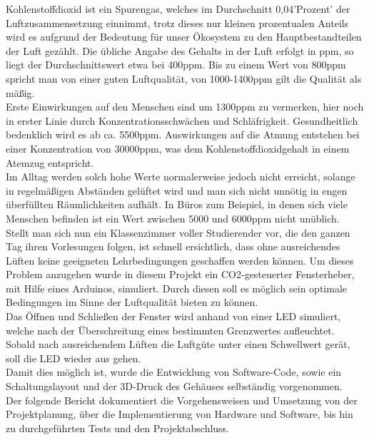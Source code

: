 
\label{Einleitung}
Kohlenstoffdioxid ist ein Spurengas, welches im Durchschnitt 0,04'Prozent' der Luftzusammensetzung einnimmt, trotz dieses nur kleinen prozentualen Anteils wird es aufgrund der Bedeutung für unser Ökosystem zu den Hauptbestandteilen der Luft gezählt. Die übliche Angabe des Gehalts in der Luft erfolgt in ppm, so liegt der Durchschnittswert etwa bei 400ppm. Bis zu einem Wert von 800ppm spricht man von einer guten Luftqualität, von 1000-1400ppm gilt die Qualität als mäßig.\\
Erste Einwirkungen auf den Menschen sind um 1300ppm zu vermerken, hier noch in erster Linie durch Konzentrationsschwächen und Schläfrigkeit. Gesundheitlich bedenklich wird es ab ca. 5500ppm. Auswirkungen auf die Atmung entstehen bei einer Konzentration von 30000ppm, was dem Kohlenstoffdioxidgehalt in einem Atemzug entspricht.\\
Im Alltag werden solch hohe Werte normalerweise jedoch nicht erreicht, solange in regelmäßigen Abständen gelüftet wird und man sich nicht unnötig in engen überfüllten Räumlichkeiten aufhält. In Büros zum Beispiel, in denen sich viele Menschen befinden ist ein Wert zwischen 5000 und 6000ppm nicht unüblich.\\
Stellt man sich nun ein Klassenzimmer voller Studierender vor, die den ganzen Tag ihren Vorlesungen folgen, ist schnell ersichtlich, dass ohne ausreichendes Lüften keine geeigneten Lehrbedingungen geschaffen werden können. Um dieses Problem anzugehen wurde in diesem Projekt ein CO2-gesteuerter Fensterheber, mit Hilfe eines Arduinos, simuliert. Durch diesen soll es möglich sein optimale Bedingungen im Sinne der Luftqualität bieten zu können. \\


Das Öffnen und Schließen der Fenster wird anhand von einer LED simuliert, welche nach der Überschreitung eines bestimmten Grenzwertes aufleuchtet. Sobald nach ausreichendem Lüften die Luftgüte unter einen Schwellwert gerät, soll die LED wieder aus gehen. \\
Damit dies möglich ist, wurde die Entwicklung von Software-Code, sowie ein Schaltungslayout und der 3D-Druck des Gehäuses selbständig vorgenommen. \\
Der folgende Bericht dokumentiert die Vorgehensweisen und Umsetzung von der Projektplanung, über die Implementierung von Hardware und Software, bis hin zu durchgeführten Tests und den Projektabschluss.